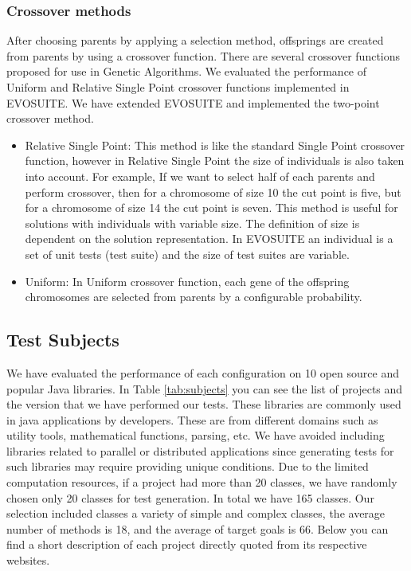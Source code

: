 \documentclass[sigconf]{acmart}
\begin{document}
\subsubsection{Crossover methods}
After choosing parents by applying a selection method, offsprings are created from parents by using a
crossover function. There are several crossover functions proposed for use in Genetic Algorithms. We evaluated
the performance of Uniform and Relative Single Point crossover functions implemented in EVOSUITE. We have 
extended EVOSUITE and implemented the two-point crossover method.
\begin{itemize}
  \item{Relative Single Point}: This method is like the standard Single Point crossover function,
  however in Relative Single Point the size of individuals is also taken into account. For example, If we want
  to select half of each parents and perform crossover, then for a chromosome of size 10 the cut point is five,
  but for a chromosome of size 14 the cut point is seven. This method is useful for solutions with individuals
  with variable size. The definition of size is dependent on the solution representation. In EVOSUITE
  an individual is a set of unit tests (test suite) and the size of test suites are variable.
  \item{Uniform}: In Uniform crossover function, each gene of the offspring chromosomes are selected
  from parents by a configurable probability.
\end{itemize}


\subsection{Test Subjects}
\label{testsubjects}
We have evaluated the performance of each configuration on 10 open source and popular Java libraries.
In Table \ref{tab:subjects} you can see the list of projects and the version that we have performed 
our tests. These libraries are commonly used in java applications by developers. These are 
from different domains such as utility tools, mathematical functions, parsing, etc. 
We have avoided including libraries related to parallel or distributed applications since
generating tests for such libraries may require providing unique conditions. Due to the limited computation resources,
if a project had more than 20 classes, we have randomly chosen only 20 classes for test generation.
In total we have 165 classes. Our selection included classes a variety of simple and complex classes, 
the average number of methods is 18, and the average of target goals is 66. Below you can find a short 
description of each project directly quoted from its respective websites.
\end{document}
